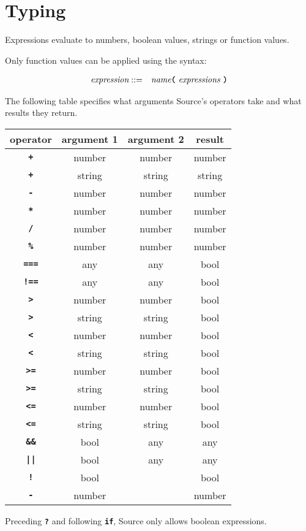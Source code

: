 
\section*{Typing}

Expressions evaluate to numbers, boolean values, strings or function values. 

Only function values can be applied using the syntax:

\begin{eqnarray*}
 \textit{expression}    
                                   & ::=   &  \textit{name}
                                               \texttt{\textbf{(}}\  \textit{expressions} \
                                               \texttt{\textbf{)}}\\ 
\end{eqnarray*}

The following table specifies what arguments Source's operators
take and what results they return.

\begin{center}
\begin{tabular}{c|c|c|c}
operator & argument 1 & argument 2 & result\\ \hline
\texttt{\textbf{+}} & number   & number     & number\\
\texttt{\textbf{+}} & string   & string     & string\\
\texttt{\textbf{-}} & number   & number     & number\\
\texttt{\textbf{*}} & number   & number     & number\\
\texttt{\textbf{/}} & number   & number     & number\\
\texttt{\textbf{\%}} & number   & number     & number\\
\texttt{\textbf{===}} & any   & any     & bool\\
\texttt{\textbf{!==}} & any   & any     & bool\\
\texttt{\textbf{>}} & number   & number     & bool\\
\texttt{\textbf{>}} & string   & string     & bool\\
\texttt{\textbf{<}} & number   & number     & bool\\
\texttt{\textbf{<}} & string   & string     & bool\\
\texttt{\textbf{>=}} & number   & number     & bool\\
\texttt{\textbf{>=}} & string   & string     & bool\\
\texttt{\textbf{<=}}    & number   & number     & bool\\
\texttt{\textbf{<=}} & string   & string     & bool\\
\texttt{\textbf{\&\&}} & bool & any & any\\
\texttt{\textbf{||}}   & bool & any & any\\
\texttt{\textbf{!}}    & bool &      & bool\\
\texttt{\textbf{-}}    & number &    & number
\end{tabular}
\end{center}

Preceding \texttt{\textbf{?}} and following \texttt{\textbf{if}}, Source only allows
boolean expressions.
